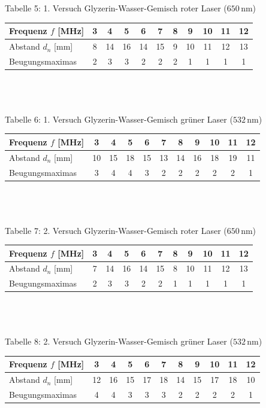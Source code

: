 \documentclass[fontsize=12pt]{scrartcl}
\begin{document}
~\\
~\\
Tabelle 5: 1. Versuch Glyzerin-Wasser-Gemisch roter Laser ($650$\,nm) \\
\begin{tabular}{|l|c|c|c|c|c|c|c|c|c|c|} \hline
Frequenz $f$ [MHz] & 3 & 4 & 5 & 6 & 7 & 8 & 9 & 10 & 11 & 12\\ \hline
Abstand $d_n$ [mm] & 8 & 14 & 16 & 14 & 15 & 9 & 10 & 11 & 12 & 13 \\ \hline
Beugungsmaximas & 2 & 3 & 3 & 2 & 2 & 2 & 1 & 1 & 1 & 1 \\ \hline 
\end{tabular} \\
~\\
~\\
Tabelle 6: 1. Versuch Glyzerin-Wasser-Gemisch grüner Laser ($532$\,nm) \\
\begin{tabular}{|l|c|c|c|c|c|c|c|c|c|c|} \hline
Frequenz $f$ [MHz] & 3 & 4 & 5 & 6 & 7 & 8 & 9 & 10 & 11 & 12\\ \hline
Abstand $d_n$ [mm] & 10 & 15 & 18 & 15 & 13 & 14 & 16 & 18 & 19 & 11 \\ \hline
Beugungsmaximas & 3 & 4 & 4 & 3 & 2 & 2 & 2 & 2 & 2 & 1 \\ \hline 
\end{tabular} \\
~\\
~\\
Tabelle 7: 2. Versuch Glyzerin-Wasser-Gemisch roter Laser ($650$\,nm) \\
\begin{tabular}{|l|c|c|c|c|c|c|c|c|c|c|} \hline
Frequenz $f$ [MHz] & 3 & 4 & 5 & 6 & 7 & 8 & 9 & 10 & 11 & 12\\ \hline
Abstand $d_n$ [mm] & 7 & 14 & 16 & 14 & 15 & 8 & 10 & 11 & 12 & 13 \\ \hline
Beugungsmaximas & 2 & 3 & 3 & 2 & 2 & 1 & 1 & 1 & 1 & 1 \\ \hline 
\end{tabular} \\
~\\
~\\
Tabelle 8: 2. Versuch Glyzerin-Wasser-Gemisch grüner Laser ($532$\,nm) \\
\begin{tabular}{|l|c|c|c|c|c|c|c|c|c|c|} \hline
Frequenz $f$ [MHz] & 3 & 4 & 5 & 6 & 7 & 8 & 9 & 10 & 11 & 12\\ \hline
Abstand $d_n$ [mm] & 12 & 16 & 15 & 17 & 18 & 14 & 15 & 17 & 18 & 10 \\ \hline
Beugungsmaximas & 4 & 4 & 3 & 3 & 3 & 2 & 2 & 2 & 2 & 1 \\ \hline 
\end{tabular}
\end{document}
